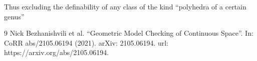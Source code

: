 \documentclass[a4paper]{article}
\begin{document}
Thus excluding the definability of any class of the kind ``polyhedra of a certain genus''
	
\begin{thebibliography}{9}
 Nick Bezhanishvili et al. “Geometric Model Checking of Continuous Space”. In: CoRR
abs/2105.06194 (2021). arXiv: 2105.06194. url: https://arxiv.org/abs/2105.06194.

\end{thebibliography}
\end{document}
